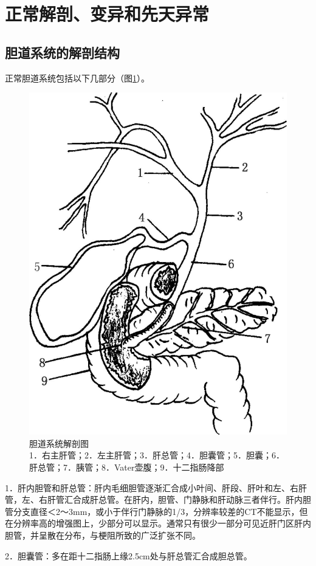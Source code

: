 \section{正常解剖、变异和先天异常}

\subsection{胆道系统的解剖结构}

正常胆道系统包括以下几部分（图\ref{fig12-1}）。

\begin{figure}[!htbp]
 \centering
 \includegraphics[width=.7\textwidth,height=\textheight,keepaspectratio]{./images/Image00290.jpg}
 \captionsetup{justification=centering}
 \caption{胆道系统解剖图\\{\small 1．右主肝管；2．左主肝管；3．肝总管；4．胆囊管；5．胆囊；6．肝总管；7．胰管；8．Vater壶腹；9．十二指肠降部}}
 \label{fig12-1}
  \end{figure} 

1．肝内胆管和肝总管：肝内毛细胆管逐渐汇合成小叶间、肝段、肝叶和左、右肝管，左、右肝管汇合成肝总管。在肝内，胆管、门静脉和肝动脉三者伴行。肝内胆管分支直径＜2～3mm，或小于伴行门静脉的1/3，分辨率较差的CT不能显示，但在分辨率高的增强图上，少部分可以显示。通常只有很少一部分可见近肝门区肝内胆管，并呈散在分布，与梗阻所致的广泛扩张不同。

2．胆囊管：多在距十二指肠上缘2.5cm处与肝总管汇合成胆总管。

